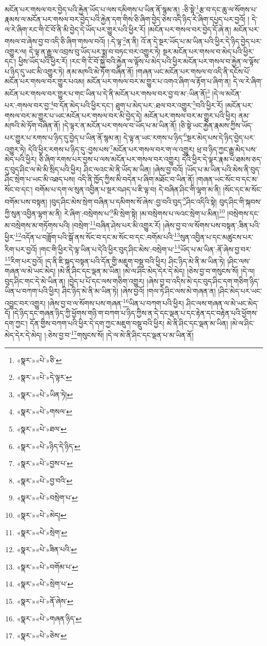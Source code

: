 མངོན་པར་གསལ་བར་བྱེད་པའི་རྐྱེན་ཡོད་པ་ལས་དམིགས་པ་ཡིན་ནོ་སྙམ་ན། :ཅི་སྟེ་\footnote{«སྣར་»«པེ་»ཅི་}རྩ་བ་དང་ཆུ་ལ་སོགས་པ་རྣམས་ལ་མངོན་པར་གསལ་བར་བྱེད་པའི་རྐྱེན་དག་གིས་ཅི་ཞིག་བྱེད་ཅེས་འདི་ཉིད་རེ་ཞིག་དཔྱད་པར་བྱའོ། །
དེ་ལ་རེ་ཞིག་རང་གི་ངོ་བོ་ནི་མི་བྱེད་དེ་ཡོད་པར་གྱུར་པའི་ཕྱིར་རོ། །མངོན་པར་གསལ་བར་བྱེད་དོ་ཞེ་ན། མངོན་པར་གསལ་བ་ཞེས་བྱ་བ་འདི་ཅི་ཞིག་གསལ་བའོ། །:དེ་ལྟ་\footnote{«སྣར་»«པེ་»དེ་ལྟར་}ན་ནི། འོ་ན་དེ་སྔར་ཡོད་པ་མ་ཡིན་པའི་ཕྱིར་དེ་ཉིད་བྱེད་པར་འགྱུར་ལ། དེ་ལྟ་ན་རྒྱུ་ལ་འབྲས་བུ་ཡོད་པར་སྨྲ་བ་བཏང་བར་འགྱུར་ཏེ། སྔར་མངོན་པར་གསལ་བ་མེད་པའི་ཕྱིར་དང་། ཕྱིས་ཡོད་པའི་ཕྱིར་རོ། །རང་གི་ངོ་བོ་སྐྱེ་བའི་རྐྱེན་ལ་ལྟོས་པ་མེད་པའི་ཕྱིར་མངོན་པར་གསལ་བ་རྐྱེན་ལ་ལྟོས་པ་ཉིད་དུ་ཡང་མི་འགྱུར་ཏེ། ནམ་མཁའི་མེ་ཏོག་བཞིན་ནོ། །གཞན་ཡང་མངོན་པར་གསལ་བ་འདི་ནི་དངོས་པོ་མངོན་པར་གསལ་བར་གྱུར་པའམ། མངོན་པར་གསལ་བར་མ་གྱུར་པ་འགའ་ཞིག་ལ་རྟོག་པ་ཞིག་ན། དེ་ལ་རེ་ཞིག་མངོན་པར་གསལ་བར་གྱུར་པ་གང་ཡིན་པ་དེ་ནི་མངོན་པར་གསལ་བར་བྱ་བ་མ་:ཡིན་ནོ།\footnote{«སྣར་»«པེ་»ཡིན་ཏེ།} །དེ་ལ་མངོན་པར་:གསལ་བར་བྱ་\footnote{«སྣར་»«པེ་»གསལ་}བ་དོན་མེད་པའི་ཕྱིར་དང་། ཐུག་པ་མེད་པར་:ཐལ་བར་འགྱུར་\footnote{«སྣར་»«པེ་»ཐལ་}བའི་ཕྱིར་རོ། །མངོན་པར་གསལ་བར་མ་གྱུར་པ་ཡང་མངོན་པར་གསལ་བར་མི་བྱེད་དེ། མངོན་པར་གསལ་བར་མ་གྱུར་པའི་ཕྱིར། ནམ་མཁའི་མེ་ཏོག་བཞིན་ནོ། །དེ་ལྟར་ན་མངོན་པར་གསལ་བ་ཡོད་པ་མ་ཡིན་ནོ། །ཅི་སྟེ་ཡང་རྐྱེན་རྣམས་ཀྱིས་ཡོད་པར་གྱུར་པ་རགས་པ་ཉིད་དུ་བྱེད་པ་ཡིན་ནོ་སྙམ་ན། དེ་ལྟ་ན་ཡང་རགས་པ་ཉིད་\footnote{«སྣར་»«པེ་»ཉིད་དེ་ཉིད་}སྔར་མེད་པས་དེ་ཉིད་བྱེད་པར་འགྱུར་ཏེ། དེའི་ཕྱིར་རགས་པ་ཉིད་དུ་:བྱས་པས་\footnote{«སྣར་»«པེ་»བྱས་པ་}མངོན་པར་གསལ་བར་ག་ལ་འགྱུར། ཕྲ་བ་ཉིད་ཀྱང་རྒྱུ་མེད་པས་མེད་པའི་ཕྱིར། ཅི་ཞིག་རགས་པར་བྱས་པ་ལས་མངོན་པར་གསལ་བར་འགྱུར། དེའི་ཕྱིར་དེ་ལྟར་རྣམ་པ་ཐམས་ཅད་དུ་བུད་ཤིང་ལ་མེ་མི་སྲིད་པའི་ཕྱིར། ཤིང་ལའང་མེ་ནི་ཡོད་མ་ཡིན། །ཞེས་བྱ་བའོ། །ཡོད་པ་མ་ཡིན་པའི་མེས་ནི་བུད་ཤིང་སྲེག་པ་ཡང་མི་འཐད་པས། འདི་ནི་ཁྱོད་ཀྱིས་མི་བདེན་པ་ཞིག་མཐོང་བ་ཡིན་ནོ། །གཞན་ཡང་སོང་བ་དང་མ་སོང་བ་དང་། བགོམ་པ་དག་ལ་སུན་འབྱིན་པ་སྔར་བཤད་པ་ཇི་ལྟ་བ། དེ་བཞིན་ཤིང་གི་ལྷག་མ་ནི། །སོང་དང་མ་སོང་བགོམ་པས་བསྟན། །བུད་ཤིང་མེས་སྲེག་བཞིན་པ་དམིགས་སོ་ཞེས་:བྱ་བའི་བུད་\footnote{«སྣར་»«པེ་»བྱ་བའི་}ཤིང་འདིའི་སྟེ། བུད་ཤིང་གི་སྐབས་ཀྱི་སུན་འབྱིན་ལྷག་མ་ནི། རེ་ཞིག་:བསྲེགས་པ་\footnote{«སྣར་»«པེ་»བསྲེག་པ་}མི་སྲེག་སྟེ། །མ་བསྲེགས་པ་ལའང་སྲེག་པ་མིན།\footnote{«སྣར་»«པེ་»མེད།} །བསྲེགས་དང་མ་བསྲེགས་མ་གཏོགས་པའི། །བསྲེག་\footnote{«སྣར་»«པེ་»སྲེག་}བཞིན་ཤེས་པར་མི་འགྱུར་རོ། །ཞེས་བྱ་བ་ལ་སོགས་པས་བསྟན་:ཟིན་པའི་ཕྱིར་\footnote{«སྣར་»«པེ་»ཟིན་པའི་}འདོན་པ་བཟློག་པའི་སྒོ་ནས་སོང་བ་དང་མ་སོང་བ་དང་:བགོམ་པའི་\footnote{«སྣར་»«པེ་»བགོམ་པ་}སུན་འབྱིན་པ་དང་མཚུངས་པར་རིག་པར་བྱའོ། །གང་གི་ཕྱིར་དེ་ལྟ་ཡིན་པ་དེའི་ཕྱིར་བུད་ཤིང་མེས་:བསྲེག་པ་\footnote{«སྣར་»«པེ་»སྲེག་པ་}ཡོད་པ་མ་ཡིན་:ནོ་ཞེས་བྱ་བར་\footnote{«སྣར་»«པེ་»ནོ་ཞེས་}རིག་པར་བྱའོ། །ད་ནི་ཇི་སྐད་བསྟན་པའི་དོན་གྱི་མཇུག་བསྡུ་བའི་ཕྱིར། ཤིང་ཉིད་མེ་ནི་མ་ཡིན་ཏེ། །ཤིང་ལས་གཞན་ལ་མེ་ཡང་མེད། །མེ་ནི་ཤིང་དང་ལྡན་མ་ཡིན། །མེ་ལ་ཤིང་མེད་དེར་དེ་མེད། །ཅེས་བྱ་བ་གསུངས་སོ། །དེ་ལ། བུད་ཤིང་གང་དེ་མེ་ཡིན་ན། །བྱེད་པ་པོ་དང་ལས་གཅིག་འགྱུར། །ཞེས་བྱ་བ་འདིས་མེ་དང་བུད་ཤིང་དག་གཅིག་ཉིད་ཡིན་པ་བཀག་པའི་ཕྱིར། ཤིང་ཉིད་མེ་ནི་མ་ཡིན་ཏེ། །ཞེས་བྱའོ། །གལ་ཏེ་ཤིང་ལས་མེ་གཞན་ན། །ཤིང་མེད་པར་ཡང་འབྱུང་བར་འགྱུར། །ཞེས་བྱ་བ་ལ་སོགས་པས་གཞན་\footnote{«སྣར་»«པེ་»གཞན་ཉིད་}ཡིན་པ་བཀག་པའི་ཕྱིར། ཤིང་ལས་གཞན་ལ་མེ་ཡང་མེད་དོ། །དེ་ཉིད་དང་གཞན་ཉིད་ཀྱི་ཕྱོགས་གཉི་ག་བཀག་པ་ཉིད་ཀྱིས་ན་དེ་དང་ལྡན་པ་དང་རྟེན་དང་བརྟེན་པའི་ཕྱོགས་དག་ཀྱང་། དོན་གྱིས་བཀག་པའི་ཕྱིར་དེ་དག་ཀྱང་མཇུག་བསྡུ་བའི་ཕྱིར། མེ་ནི་ཤིང་དང་ལྡན་མ་ཡིན། །མེ་ལ་ཤིང་མེད་དེར་དེ་མེད། །:ཅེས་བྱ་བ་\footnote{«སྣར་»«པེ་»ཅེས་}གསུངས་སོ། །དེ་ལ་མེ་ནི་ཤིང་དང་ལྡན་པ་མ་ཡིན་ནོ། 